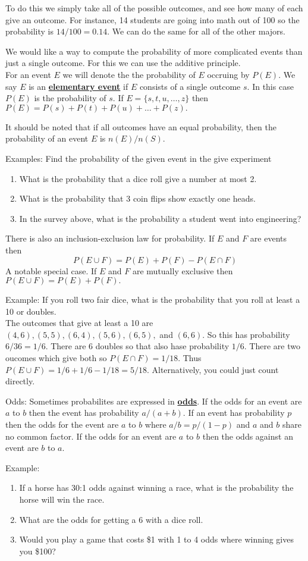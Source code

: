 \documentclass[14,fleqn]{article}
\newcommand{\defn}[1]{\textbf{\underline{#1}}}
\begin{document}
To do this we simply take all of the possible outcomes, and see how many of each give an outcome. For instance, 14 students are going into math out of 100 so the probability is $14/100=0.14.$
We can do the same for all of the other majors.

We would like a way to compute the probability of more complicated events than just a single outcome. For this we can use the additive principle.\\

For an event $E$ we will denote the the probability of $E$ occruing by $P(E).$ We say $E$ is an \defn{elementary event} if $E$ consists of a single outcome $s.$ In this case $P(E)$ is the probability of $s.$ If $E=\{s,t,u,\dots,z\}$ then $P(E)=P(s)+P(t)+P(u)+\dots +P(z).$

It should be noted that if all outcomes have an equal probability, then the probability of an event $E$ is $n(E)/n(S).$ 

Examples: Find the probability of the given event in the give experiment
\begin{enumerate}
	\item What is the probability that a dice roll give a number at most 2.
	\item What is the probability that 3 coin flips show exactly one heads.
	\item In the survey above, what is the probability a student went into engineering?
\end{enumerate}

There is also an inclusion-exclusion law for probability.  If $E$ and $F$ are events then 
\[
	P(E\cup F)=P(E)+P(F)-P(E\cap F)
\]
A notable special case. If $E$ and $F$ are mutually exclusive then $P(E\cup F)=P(E)+P(F).$

Example: If you roll two fair dice, what is the probability that you roll at least a 10 or doubles.\\

The outcomes that give at least a 10 are $(4,6), (5,5), (6,4), (5,6),(6,5),$ and $(6,6).$ So this has probability $6/36=1/6.$ There are 6 doubles so that also hase probability $1/6.$ There are two oucomes which give both so $P(E\cap F)=1/18.$ Thus $P(E\cup F)=1/6+1/6-1/18=5/18.$ Alternatively, you could just count directly.


Odds: Sometimes probabilites are expressed in \defn{odds}. If the odds for an event are $a$ to $b$ then the event has probability $a/(a+b).$ If an event has probability $p$ then the odds for the event are $a$ to $b$ where $a/b=p/(1-p)$ and $a$ and $b$ share no common factor. If the odds for an event are $a$ to $b$ then the odds against an event are $b$ to $a.$

Example:\\
\begin{enumerate}
	\item If a horse has 30:1 odds against winning a race, what is the probability the horse will win the race.
	\item What are the odds for getting a 6 with a dice roll.
	\item Would you play a game that costs \$1 with 1 to 4 odds where winning gives you \$100?
\end{enumerate}
\end{document}
